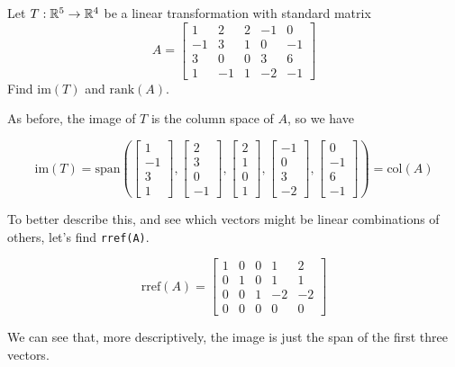 \documentclass{ximera}
\begin{document}
\begin{example}\label{ex:image2}
Let $T:\mathbb{R}^5\rightarrow \mathbb{R}^4$ be a linear transformation with standard matrix $$A=\begin{bmatrix}1 & 2 & 2 &-1 & 0\\-1 & 3 & 1 & 0 & -1\\3 & 0 & 0 & 3 & 6\\ 1 & -1 & 1 & -2 & -1\end{bmatrix}$$
Find $\mbox{im}(T)$ and $\mbox{rank}(A)$.

\begin{explanation}
As before, the image of $T$ is the column space of $A$, so we have 

$$\mbox{im}(T)=\mbox{span}\left(\begin{bmatrix}1\\-1\\3\\1\end{bmatrix}, \begin{bmatrix}2\\3\\0\\-1\end{bmatrix}, \begin{bmatrix}2\\1\\0\\1\end{bmatrix}, \begin{bmatrix}-1\\0\\3\\-2\end{bmatrix}, \begin{bmatrix}0\\-1\\6\\-1\end{bmatrix}\right)=\mbox{col}(A)$$

To better describe this, and see which vectors might be linear combinations of others, let's find \texttt{rref(A)}.
 
$$\text{rref}(A)=\begin{bmatrix} 1 & 0 & 0 & 1 & 2\\0 & 1 & 0 & 1 & 1\\0 & 0 & 1 & -2 & -2\\ 0 & 0 & 0 & 0 & 0 \end{bmatrix}$$
 
We can see that, more descriptively, the image is just the span of the first three vectors.


\end{explanation}
\end{example}
\end{document}
